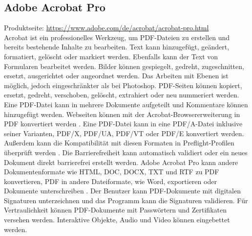 \subsection{Adobe Acrobat Pro}
Produktseite: \url{https://www.adobe.com/de/acrobat/acrobat-pro.html} \\
Acrobat ist ein professionelles Werkzeug, um PDF-Dateien zu erstellen und bereits bestehende Inhalte zu bearbeiten. Text kann hinzugefügt, geändert, formatiert, gelöscht oder markiert werden. Ebenfalls kann der Text von Formularen bearbeitet werden. Bilder können gespiegelt, gedreht, zugeschnitten, ersetzt, ausgerichtet oder angeordnet werden. Das Arbeiten mit Ebenen ist möglich, jedoch eingeschränkter als bei Photoshop. PDF-Seiten können kopiert, ersetzt, gedreht, verschoben, gelöscht, extrahiert oder neu nummeriert werden. Eine PDF-Datei kann in mehrere Dokumente aufgeteilt und Kommentare können hinzugefügt werden. Webseiten können mit der Acrobat-Browsererweiterung in PDF konvertiert werden \cite{adobe-acrobat-um}. Eine PDF-Datei kann in eine PDF/A-Datei inklusive seiner Varianten, PDF/X, PDF/UA, PDF/VT oder PDF/E konvertiert werden. Außerdem kann die Kompatibilität mit diesen Formaten in Preflight-Profilen überprüft werden \cite{adobe-pdf-a}. Die Barrierefreiheit kann automatisch validiert oder ein neues Dokument direkt barrierefrei erstellt werden. Adobe Acrobat Pro kann andere Dokumentenformate wie HTML, DOC, DOCX, TXT und RTF zu PDF konvertieren, PDF in andere Dateiformate, wie Word, exportieren oder Dokumente unterschreiben \cite{adobe-formate}. Der Benutzer kann PDF-Dokumente mit digitalen Signaturen unterzeichnen und das Programm kann die Signaturen validieren. Für Vertraulichkeit können PDF-Dokumente mit Passwörtern und Zertifikaten versehen werden. Interaktive Objekte, Audio und Video können eingebettet werden. 
\par
